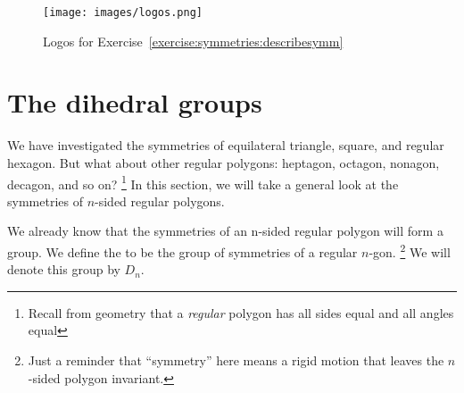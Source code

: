 \begin{figure}
\begin{center}
\texttt{[image: images/logos.png]}
\caption{Logos for Exercise~\ref{exercise:symmetries:describesymm}}
\label{logos}
\end{center}
\end{figure}

\section{The dihedral groups}\label{sec:dihedral}

We have investigated the symmetries of equilateral triangle, square, and regular hexagon. But what about other regular polygons: heptagon, octagon, nonagon, decagon, and so on?
\footnote{Recall from geometry that a \emph{regular} polygon has all sides equal and all angles equal}
In this section, we will  take a general look at the symmetries of $n$-sided regular polygons. 

We already know that the symmetries of an n-sided regular polygon will form a group. We define the  to be the group of 
symmetries of a regular $n$-gon.
\footnote{Just a reminder that ``symmetry'' here means a rigid motion that leaves the $n$-sided polygon invariant.}
  We will denote this group by
$D_n$\label{dihedralgroup}.  

